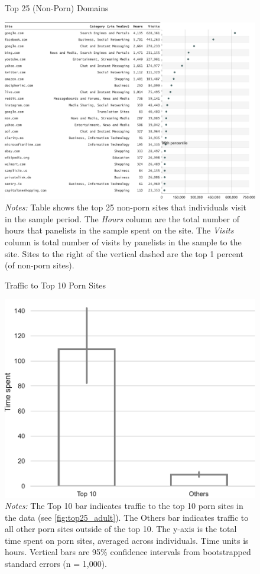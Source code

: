 \documentclass[12pt, letterpaper]{article}
\begin{document}
\begin{figure}
	\centering
	\caption{Top 25 (Non-Porn) Domains}
	\includegraphics[width=\textwidth]{../figs/top_25_nonadultsites.pdf}
	\caption*{\footnotesize \emph{Notes:} 
		Table shows the top 25 non-porn sites that individuals visit in the sample period.
		The \emph{Hours} column are the total number of hours that panelists in the sample spent on the site. 
		The \emph{Visits} column is total number of visits by panelists in the sample to the site.  			
		Sites to the right of the vertical dashed are the top 1 percent (of non-porn sites).
	}
	\label{fig:top25_nonadult}
\end{figure}


\begin{figure}
	\centering
	\caption{Traffic to Top 10 Porn Sites}
	\includegraphics[width=.5\textwidth]{../figs/concentration_porn_consumption.pdf}
	\caption*{\footnotesize \emph{Notes:} 
		The Top 10 bar indicates traffic to the top 10 porn sites in the data (see \cref{fig:top25_adult}).
		The Others bar indicates traffic to all other porn sites outside of the top 10.
		The y-axis is the total time spent on porn sites, averaged across individuals.
		Time units is hours.
		Vertical bars are 95\% confidence intervals from bootstrapped standard errors (n = 1,000).
	}
	\label{fig:concentration_porn_consumption}
\end{figure}
\end{document}
